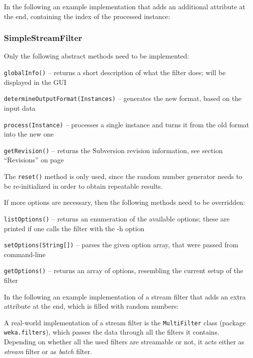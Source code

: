 \newpage
In the following an example implementation that adds an additional attribute at
the end, containing the index of the processed instance:

{\footnotesize }

\newpage
\subsubsection{SimpleStreamFilter}
Only the following abstract methods need to be implemented:
\begin{tight_itemize}
  \item \texttt{globalInfo()} -- returns a short description of what the filter
does; will be displayed in the GUI
  \item \texttt{determineOutputFormat(Instances)} -- generates the new
format, based on the input data
  \item \texttt{process(Instance)} -- processes a single instance and turns it
from the old format into the new one
  \item \texttt{getRevision()} -- returns the Subversion revision
information, see section ``Revisions'' on page \pageref{filter_revisions}
\end{tight_itemize}
The \texttt{reset()} method is only used, since the random number generator
needs to be re-initialized in order to obtain repeatable results.

If more options are necessary, then the following methods need to be overridden:
\begin{tight_itemize}
  \item \texttt{listOptions()} -- returns an enumeration of the available
options; these are printed if one calls the filter with the -h option
  \item \texttt{setOptions(String[])} -- parses the given option array,
that were passed from command-line
  \item \texttt{getOptions()} -- returns an array of options, resembling the
current setup of the filter
\end{tight_itemize}

\newpage
In the following an example implementation of a stream filter that adds an extra
attribute at the end, which is filled with random numbers:

{\footnotesize }

\noindent A real-world implementation of a stream filter is the
\texttt{MultiFilter} class (package \texttt{weka.filters}), which passes the
data through all the filters it contains. Depending on whether all the used
filters are streamable or not, it acts either as \textit{stream} filter or as
\textit{batch} filter.

